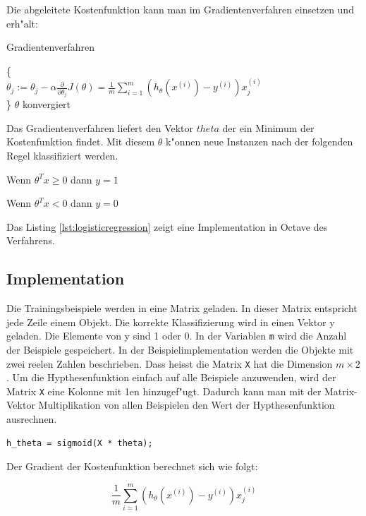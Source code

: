\documentclass[12pt,a4paper,twoside]{article}
\begin{document}
Die abgeleitete Kostenfunktion kann man im Gradientenverfahren einsetzen und erh"alt:
\begin{algorithm}
\caption{Gradientenverfahren}
\begin{algorithmic}

\Repeat \{ \\
$\theta_j := \theta_j - \alpha \frac{\partial}{\partial \theta_j} J(\theta) = \frac{1}{m} \sum_{i=1}^m (h_{\theta} (x^{(i)}) - y^{(i)})x_j^{(i)}$  \\
\}
\Until $\theta$ konvergiert 

 \end{algorithmic}  
\end{algorithm}

Das Gradientenverfahren liefert den Vektor $theta$ der ein Minimum der Kostenfunktion findet. Mit diesem $\theta$ k"onnen neue Instanzen nach der folgenden Regel klassifiziert werden.

Wenn $\theta^T x \geq 0$ dann $y=1$

Wenn $\theta^T x < 0$ dann $y=0$

Das Listing \ref{lst:logisticregression} zeigt eine Implementation in Octave des Verfahrens.

\subsection{Implementation}
\label{sec:implementation}
Die Trainingsbeispiele werden in eine Matrix geladen. In dieser Matrix entspricht jede Zeile einem Objekt. Die korrekte Klassifizierung wird in einen Vektor y geladen. Die Elemente von y sind 1 oder 0. In der Variablen \verb|m| wird die Anzahl der Beispiele gespeichert. In der Beispielimplementation werden die Objekte mit zwei reelen Zahlen beschrieben. Dass heisst die Matrix \verb|X| hat die Dimension $m \times 2$. Um die Hypthesenfunktion einfach auf alle Beispiele anzuwenden, wird der Matrix \verb|X| eine Kolonne mit 1en hinzugef"ugt. Dadurch kann man mit der Matrix-Vektor Multiplikation von allen Beispielen den Wert der Hypthesenfunktion ausrechnen.

\begin{lstlisting}
h_theta = sigmoid(X * theta);
\end{lstlisting}

Der Gradient der Kostenfunktion berechnet sich wie folgt:

\begin{equation}
\frac{1}{m} \sum_{i=1}^m (h_{\theta} (x^{(i)}) - y^{(i)})x_j^{(i)}  
\end{equation}
\end{document}
